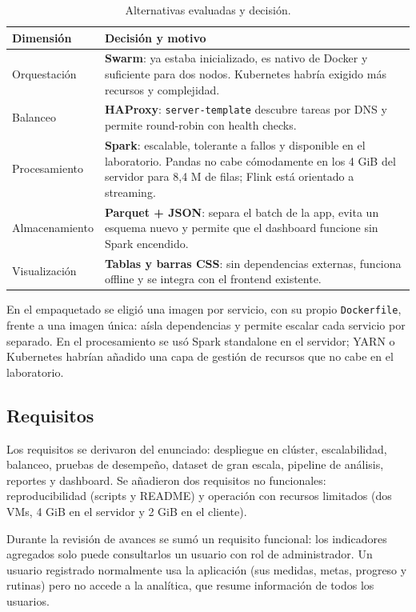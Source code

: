 \documentclass[conference]{IEEEtran}
\begin{document}
\begin{table}[t]
\centering
\caption{Alternativas evaluadas y decisión.}
\label{tab:alternativas}
\small
\begin{tabularx}{\columnwidth}{@{}l Y@{}}
\toprule
Dimensión & Decisión y motivo \\
\midrule
Orquestación & \textbf{Swarm}: ya estaba inicializado, es nativo de Docker y suficiente para dos
nodos. Kubernetes habría exigido más recursos y complejidad. \\
Balanceo & \textbf{HAProxy}: \texttt{server-template} descubre tareas por DNS y permite
round-robin con health checks. \\
Procesamiento & \textbf{Spark}: escalable, tolerante a fallos y disponible en el laboratorio.
Pandas no cabe cómodamente en los 4 GiB del servidor para 8,4 M de filas; Flink está orientado a streaming. \\
Almacenamiento & \textbf{Parquet + JSON}: separa el batch de la app, evita un esquema nuevo y
permite que el dashboard funcione sin Spark encendido. \\
Visualización & \textbf{Tablas y barras CSS}: sin dependencias externas, funciona offline y se
integra con el frontend existente. \\
\bottomrule
\end{tabularx}
\end{table}

\FloatBarrier

En el empaquetado se eligió una imagen por servicio, con su propio \texttt{Dockerfile}, frente a una
imagen única: aísla dependencias y permite escalar cada servicio por separado. En el procesamiento se
usó Spark standalone en el servidor; YARN o Kubernetes habrían añadido una capa de gestión de
recursos que no cabe en el laboratorio.

\subsection{Requisitos}
Los requisitos se derivaron del enunciado: despliegue en clúster, escalabilidad, balanceo, pruebas
de desempeño, dataset de gran escala, pipeline de análisis, reportes y dashboard. Se añadieron dos
requisitos no funcionales: reproducibilidad (scripts y README) y operación con recursos limitados
(dos VMs, 4 GiB en el servidor y 2 GiB en el cliente).

Durante la revisión de avances se sumó un requisito funcional: los indicadores agregados solo puede
consultarlos un usuario con rol de administrador. Un usuario registrado normalmente usa la aplicación
(sus medidas, metas, progreso y rutinas) pero no accede a la analítica, que resume información de todos
los usuarios.
\end{document}
